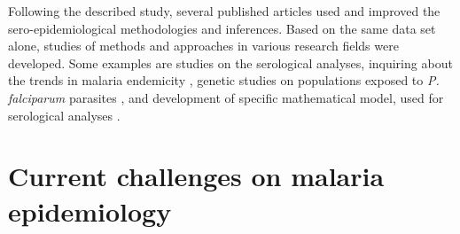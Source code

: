 Following the described study, several published articles used and improved the sero-epidemiological methodologies and inferences.
Based on the same data set alone, studies of methods and approaches in various research fields were developed.
Some examples are studies on the serological analyses, inquiring about the trends in malaria endemicity \cite{drakeley2005estimating}, genetic studies on populations exposed to \textit{P. falciparum} parasites \cite{enevold2007associations, sepulveda2017malaria}, and development of specific mathematical model, used for serological analyses \cite{bosomprah2014mathematical}.


\section{Current challenges on malaria epidemiology}
\label{seq:challenges}

